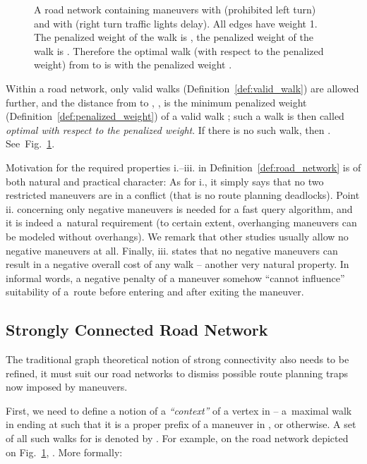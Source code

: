 \documentclass[envcountsect,envcountsame]{llncs}
\begin{document}
\begin{figure}[t]
  \centering
  \centerline{}
  \vspace*{-.5ex}
  \caption{A road network containing maneuvers  
    with  (prohibited left turn) and  
    with  (right turn traffic lights delay). All edges
    have weight 1. The penalized weight of the walk  is , the penalized weight of the walk  is . Therefore the optimal walk (with respect to the 
    penalized weight) from  to  is  
    with the penalized weight .}
  \label{fig:maneuver}
\end{figure}

Within a road network, only valid walks (Definition~\ref{def:valid_walk})
are allowed further, and the distance from  to , , is the minimum penalized weight (Definition~\ref{def:penalized_weight})
of a valid walk ; such a walk  is then 
called \emph{optimal with respect to the penalized weight}. If there is no 
such walk, then . See~Fig.~\ref{fig:maneuver}.

Motivation for the required properties i.--iii. in 
Definition~\ref{def:road_network} is of both natural and practical character:
As for i., it simply says that no two restricted maneuvers are in a
conflict (that is no route planning deadlocks). Point ii. concerning only 
negative maneuvers is needed for a fast query algorithm, and it is indeed 
a~natural requirement (to certain extent, overhanging maneuvers can be modeled 
without overhangs). We remark that other studies usually allow no negative 
maneuvers at all. Finally, iii. states that no negative maneuvers can result 
in a negative overall cost of any walk -- another very natural property.
In informal words, a negative penalty of a maneuver somehow ``cannot 
influence'' suitability of a~route before entering and after exiting the 
maneuver.

\subsection{Strongly Connected Road Network}
\label{sec:connectivity}

The traditional graph theoretical notion of strong connectivity also needs to
be refined, it must suit our road networks to dismiss possible route 
planning traps now imposed by maneuvers. 

First, we need to define a notion of a \emph{``context''} of a vertex  
in  -- a~maximal walk in  ending at  such that it is a proper 
prefix of a maneuver in , or  otherwise. A set of all such
walks for  is denoted by . For example, on the road 
network depicted on Fig.~\ref{fig:maneuver}, 
. More formally: 
\end{document}
